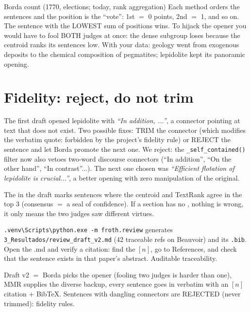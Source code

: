 \documentclass[11pt,a4paper]{article}
\begin{document}
\begin{concepto}{Borda count (1770, elections; today, rank aggregation)}
Each method orders the sentences and the position is the ``vote'': 1st $=$ 0 points, 2nd $=$ 1,
and so on. The sentence with the LOWEST sum of positions wins. To hijack the opener you would
have to fool BOTH judges at once: the dense subgroup loses because the centroid ranks its
sentences low. With your data: geology went from exogenous deposits to the chemical composition
of pegmatites; lepidolite kept its panoramic opening.
\end{concepto}

\section{Fidelity: reject, do not trim}

The first draft opened lepidolite with \emph{``In addition, ...''}, a connector pointing at text
that does not exist. Two possible fixes: TRIM the connector (which modifies the verbatim quote:
forbidden by the project's fidelity rule) or REJECT the sentence and let Borda promote the next
one. We reject: the \texttt{\_self\_contained()} filter now also vetoes two-word discourse
connectors (``In addition'', ``On the other hand'', ``In contrast''...). The next one chosen was
\emph{``Efficient flotation of lepidolite is crucial...''}, a better opening with zero
manipulation of the original.

\begin{ojo}
The \dag{} in the draft marks sentences where the centroid and TextRank agree in the top 3
(consensus $=$ a seal of confidence). If a section has no \dag, nothing is wrong, it only means
the two judges saw different virtues.
\end{ojo}

\begin{practica}
\texttt{.venv\textbackslash Scripts\textbackslash python.exe -m froth.review} generates
\texttt{3\_Resultados/review\_draft\_v2.md} (42 traceable refs on Beauvoir) and its
\texttt{.bib}. Open the .md and verify a citation: find the $[n]$, go to References, and check
that the sentence exists in that paper's abstract. Auditable traceability.
\end{practica}

\begin{resumen}
Draft v2 $=$ Borda picks the opener (fooling two judges is harder than one), MMR supplies the
diverse backup, every sentence goes in verbatim with an $[n]$ citation $+$ BibTeX. Sentences
with dangling connectors are REJECTED (never trimmed): fidelity rules.
\end{resumen}
\clearpage
{}
{}
\end{document}
